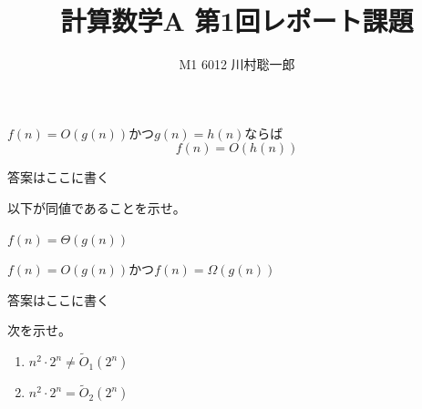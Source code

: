 \documentclass[dvipdfmx]{jsreport}
\title{計算数学A 第1回レポート課題}
\author{M1 6012 川村聡一郎}
\date{}
\begin{document}
\maketitle

\begin{tcolorbox}
	$f(n)= O(g(n))$かつ$g(n)= h(n)$ならば
\begin{equation*}
	f(n)= O(h(n))
\end{equation*}
\end{tcolorbox}

\begin{souanswer} %
	答案はここに書く
\end{souanswer}


\begin{tcolorbox}
	以下が同値であることを示せ。
\begin{enumerate_roman}
	\item $f(n)= \Theta(g(n))$
	\item $f(n)= O(g(n))$かつ$f(n)= \Omega(g(n))$
\end{enumerate_roman}
\end{tcolorbox}

\begin{souanswer} %
	答案はここに書く
\end{souanswer}

\begin{tcolorbox}
	次を示せ。
\begin{enumerate}
	\item $n^2\cdot 2^n\ne \tilde{O}_1(2^n)$
	\item $n^2\cdot 2^n= \tilde{O}_2(2^n)$
\end{enumerate}
\end{tcolorbox}
\end{document}

